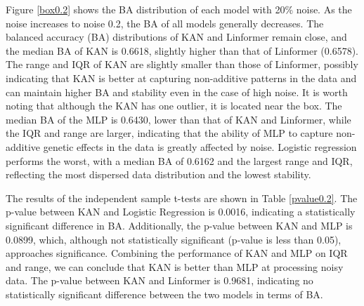 \documentclass{article}
\begin{document}
Figure \ref{box0.2} shows the BA distribution of each model with 20\% noise. As the noise increases to noise 0.2, the BA of all models generally decreases. The balanced accuracy (BA) distributions of KAN and Linformer remain close, and the median BA of KAN is 0.6618, slightly higher than that of Linformer (0.6578). The range and IQR of KAN are slightly smaller than those of Linformer,  possibly indicating that KAN is better at capturing non-additive patterns in the data and can maintain higher BA and stability even in the case of high noise. It is worth noting that although the KAN has one outlier, it is located near the box. The median BA of the MLP is 0.6430, lower than that of KAN and Linformer, while the IQR and range are larger, indicating that the ability of MLP to capture non-additive genetic effects in the data is greatly affected by noise. Logistic regression performs the worst, with a median BA of 0.6162 and the largest range and IQR, reflecting the most dispersed data distribution and the lowest stability.

The results of the independent sample t-tests are shown in Table \ref{pvalue0.2}. The p-value between KAN and Logistic Regression is 0.0016, indicating a statistically significant difference in BA. Additionally, the p-value between KAN and MLP is 0.0899, which, although not statistically significant (p-value is less than 0.05), approaches significance. Combining the performance of KAN and MLP on IQR and range, we can conclude that KAN is better than MLP at processing noisy data. The p-value between KAN and Linformer is 0.9681, indicating no statistically significant difference between the two models in terms of BA.

 

\begin{table}[htbp]
\centering
\caption{Time Taken and GPU Usage under Different Noise Conditions}
\label{Gpuuseandtime}
\end{table}
\end{document}
